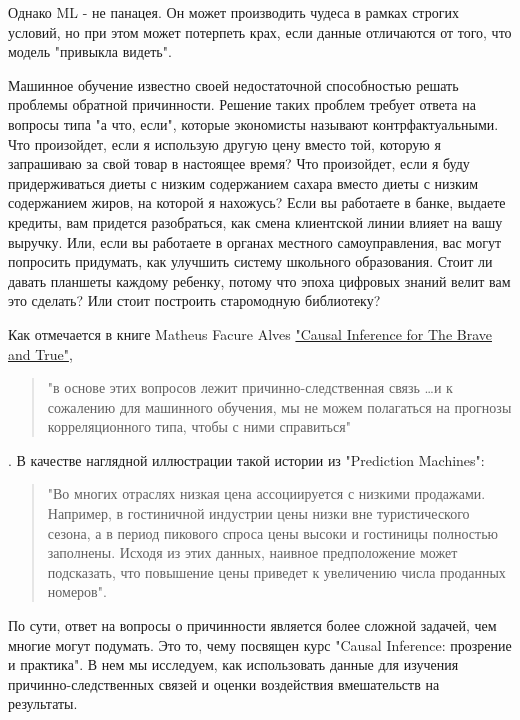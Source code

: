 \documentclass{article}
\newcommand{\coursename}{Causal Inference: прозрение и практика}
\begin{document}
        Однако ML - не панацея.
        Он может производить чудеса в рамках строгих условий, но при этом может потерпеть крах, если данные отличаются от того, что модель "привыкла видеть".

        Машинное обучение известно своей недостаточной способностью решать проблемы обратной причинности.
        Решение таких проблем требует ответа на вопросы типа "а что, если"{}, которые экономисты называют контрфактуальными.
        Что произойдет, если я использую другую цену вместо той, которую я запрашиваю за свой товар в настоящее время?
        Что произойдет, если я буду придерживаться диеты с низким содержанием сахара вместо диеты с низким содержанием жиров, на которой я нахожусь?
        Если вы работаете в банке, выдаете кредиты, вам придется разобраться, как смена клиентской линии влияет на вашу выручку.
        Или, если вы работаете в органах местного самоуправления, вас могут попросить придумать, как улучшить систему школьного образования.
        Стоит ли давать планшеты каждому ребенку, потому что эпоха цифровых знаний велит вам это сделать?
        Или стоит построить старомодную библиотеку?

        Как отмечается в книге Matheus Facure Alves \href{https://matheusfacure.github.io/python-causality-handbook/landing-page.html}{"Causal Inference for The Brave and True"}{},
        \begin{quote}
            "в основе этих вопросов лежит причинно-следственная связь \ldots и к сожалению для машинного обучения, мы не можем полагаться на прогнозы корреляционного типа, чтобы с ними справиться"
        \end{quote}.
        В качестве наглядной иллюстрации такой истории из "Prediction Machines":
        \begin{quote}
            "Во многих отраслях низкая цена ассоциируется с низкими продажами.
            Например, в гостиничной индустрии цены низки вне туристического сезона, а в период пикового спроса цены высоки и гостиницы полностью заполнены.
            Исходя из этих данных, наивное предположение может подсказать, что повышение цены приведет к увеличению числа проданных номеров".
        \end{quote}

        По сути, ответ на вопросы о причинности является более сложной задачей, чем многие могут подумать.
        Это то, чему посвящен курс "\coursename".
        В нем мы исследуем, как использовать данные для изучения причинно-следственных связей и оценки воздействия вмешательств на результаты.
\end{document}
